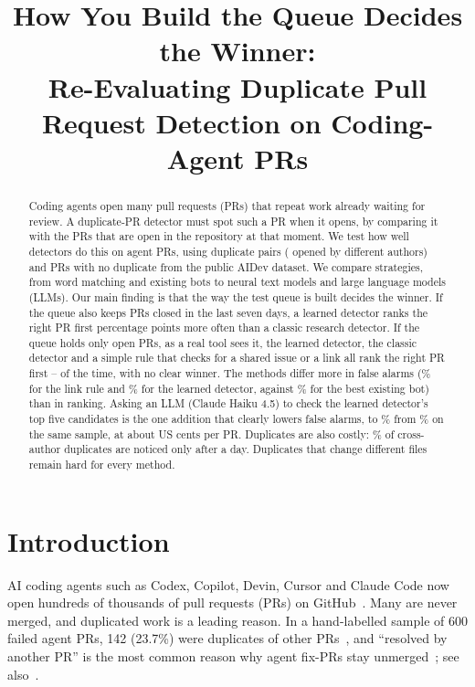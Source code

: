 \documentclass[10pt,conference]{IEEEtran}
\begin{document}
\title{How You Build the Queue Decides the Winner:\\Re-Evaluating Duplicate Pull Request Detection on Coding-Agent PRs}
\author{}
\maketitle

\begin{abstract}\normalfont
Coding agents open many pull requests (PRs) that repeat work already waiting for review. A duplicate-PR detector must spot such a PR when it opens, by comparing it with the PRs that are open in the repository at that moment. We test how well detectors do this on agent PRs, using \nPairs{} duplicate pairs (\nCross{} opened by different authors) and \nNeg{} PRs with no duplicate from the public AIDev dataset. We compare \nStrategies{} strategies, from word matching and existing bots to neural text models and large language models (LLMs). Our main finding is that the way the test queue is built decides the winner. If the queue also keeps PRs closed in the last seven days, a learned detector ranks the right PR first \dGsevenIntrude{} percentage points more often than a classic research detector. If the queue holds only open PRs, as a real tool sees it, the learned detector, the classic detector and a simple rule that checks for a shared issue or a link all rank the right PR first \ROnetfidfRaw--\ROnelinks{} of the time, with no clear winner. The methods differ more in false alarms (\FARxlinks\% for the link rule and \FARjinx\% for the learned detector, against \FARxcg\% for the best existing bot) than in ranking. Asking an LLM (Claude Haiku 4.5) to check the learned detector's top five candidates is the one addition that clearly lowers false alarms, to \FARsubhaiku\% from \FARsubjinx\% on the same sample, at about \costHaikuPerPR{} US cents per PR. Duplicates are also costly: \dupLateOneD\% of cross-author duplicates are noticed only after a day. Duplicates that change different files remain hard for every method.
\end{abstract}

\section{Introduction}
AI coding agents such as Codex, Copilot, Devin, Cursor and Claude Code now open hundreds of thousands of pull requests (PRs) on GitHub~\cite{li2026aidev}. Many are never merged, and duplicated work is a leading reason. In a hand-labelled sample of 600 failed agent PRs, 142 (23.7\%) were duplicates of other PRs~\cite{ehsani2026fail}, and ``resolved by another PR'' is the most common reason why agent fix-PRs stay unmerged~\cite{alam2026unmerged}; see also~\cite{nakashima2026rejected,abujadallah2026rejection}.
\end{document}
